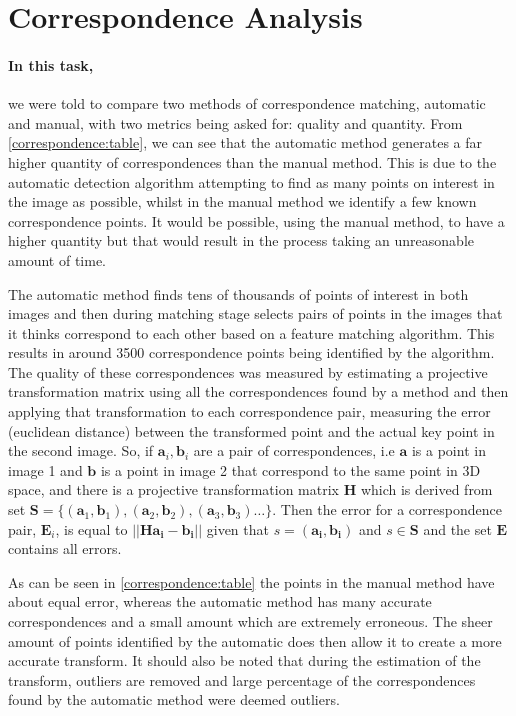 \section{Correspondence Analysis}

\paragraph{In this task,} we were told to compare two methods of correspondence matching, automatic and manual, with two metrics being asked for: quality and quantity. From \autoref{correspondence:table}, we can see that the automatic method generates a far higher quantity of correspondences than the manual method. This is due to the automatic detection algorithm attempting to find as many points on interest in the image as possible, whilst in the manual method we identify a few known correspondence points. It would be possible, using the manual method, to have a higher quantity but that would result in the process taking an unreasonable amount of time. 

The automatic method finds tens of thousands of points of interest in both images and then during matching stage selects pairs of points in the images that it thinks correspond to each other based on a feature matching algorithm. This results in around 3500 correspondence points being identified by the algorithm. The quality of these correspondences was measured by estimating a projective transformation matrix using all the correspondences found by a method and then applying that transformation to each correspondence pair, measuring the error (euclidean distance) between the transformed point and the actual key point in the second image. So, if $\mathbf{a}_i, \mathbf{b}_i$ are a pair of correspondences, i.e $\mathbf{a}$ is a point in image 1 and $\mathbf{b}$ is a point in image 2 that correspond to the same point in 3D space, and there is a projective transformation matrix $\mathbf{H}$ which is derived from set $\mathbf{S} = \{(\mathbf{a}_1, \mathbf{b}_1), (\mathbf{a}_2, \mathbf{b}_2), (\mathbf{a}_3, \mathbf{b}_3) \dots\} $. Then the error for a correspondence pair, $\mathbf{E}_i$, is equal to $||\mathbf{Ha_i} - \mathbf{b_i}|| $ given that $ s = (\mathbf{a_i}, \mathbf{b_i}) $ and $ s \in \mathbf{S}$ and the set $\mathbf{E}$ contains all errors.

As can be seen in \autoref{correspondence:table} the points in the manual method have about equal error, whereas the automatic method has many accurate correspondences and a small amount which are extremely erroneous. The sheer amount of points identified by the automatic does then allow it to create a more accurate transform. It should also be noted that during the estimation of the transform, outliers are removed and large percentage of the correspondences found by the automatic method were deemed outliers.


